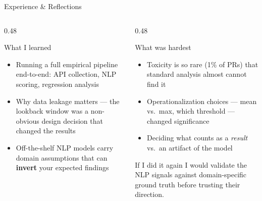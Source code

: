 \documentclass[aspectratio=169,11pt]{beamer}
\begin{document}
\begin{frame}{Experience \& Reflections}
\begin{columns}[T]
\begin{column}{0.48\textwidth}
\begin{block}{What I learned}
\begin{itemize}
  \item Running a full empirical pipeline end-to-end: API collection, NLP scoring, regression analysis
  \item Why data leakage matters --- the lookback window was a non-obvious design decision that changed the results
  \item Off-the-shelf NLP models carry domain assumptions that can \textbf{invert} your expected findings
\end{itemize}
\end{block}
\end{column}

\begin{column}{0.48\textwidth}
\begin{alertblock}{What was hardest}
\begin{itemize}
  \item Toxicity is so rare (1\% of PRs) that standard analysis almost cannot find it
  \item Operationalization choices --- mean vs.\ max, which threshold --- changed significance
  \item Deciding what counts as a \emph{result} vs.\ an artifact of the model
\end{itemize}
\end{alertblock}

\vspace{0.3em}
\begin{exampleblock}{If I did it again}
I would validate the NLP signals against domain-specific ground truth before trusting their direction.
\end{exampleblock}
\end{column}
\end{columns}
\end{frame}
\end{document}

